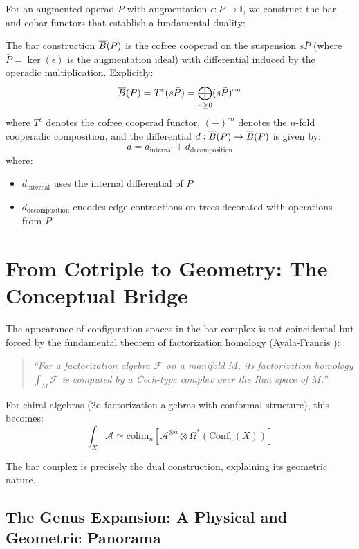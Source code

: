 \begin{example}
For an augmented operad $P$ with augmentation $\epsilon : P \to \mathbb{I}$, we construct the bar and cobar functors that establish a fundamental duality:
 
\begin{definition}
The bar construction $\overline{B}(P)$ is the cofree cooperad on the suspension $s\bar{P}$ (where $\bar{P} = \ker(\epsilon)$ is the augmentation ideal) with differential induced by the operadic multiplication. Explicitly:
\[
\overline{B}(P) = T^c(s\bar{P}) = \bigoplus_{n \geq 0} (s\bar{P})^{\circ n}
\]
where $T^c$ denotes the cofree cooperad functor, $(-)^{\circ n}$ denotes the $n$-fold cooperadic composition,
and the differential $d: \overline{B}(P) \to \overline{B}(P)$ is given by:
\[
d = d_{\text{internal}} + d_{\text{decomposition}}
\]
where:
\begin{itemize}
\item $d_{\text{internal}}$ uses the internal differential of $P$
\item $d_{\text{decomposition}}$ encodes edge contractions on trees decorated with operations from $P$
\end{itemize}
\end{definition}

\section{From Cotriple to Geometry: The Conceptual Bridge}

\begin{remark}
The appearance of configuration spaces in the bar complex is not coincidental but forced by the 
fundamental theorem of factorization homology (Ayala-Francis \cite{AF}):

\begin{quote}
\emph{``For a factorization algebra $\mathcal{F}$ on a manifold $M$, its factorization homology 
$\int_M \mathcal{F}$ is computed by a Čech-type complex over the Ran space of $M$.''}
\end{quote}

For chiral algebras (2d factorization algebras with conformal structure), this becomes:
$$\int_X \mathcal{A} \simeq \text{colim}_{n} \left[ \mathcal{A}^{\otimes n} \otimes \Omega^*(\text{Conf}_n(X)) \right]$$

The bar complex is precisely the dual construction, explaining its geometric nature.
\end{remark}

\subsection{The Genus Expansion: A Physical and Geometric Panorama}
\label{sec:genus_expansion_panorama}


\end{example}
